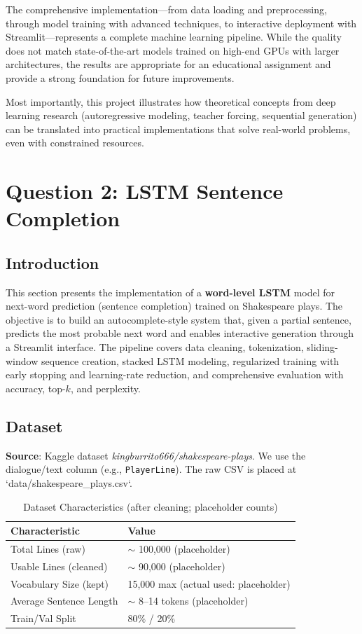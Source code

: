 \documentclass[12pt,a4paper]{article}
\begin{document}
The comprehensive implementation—from data loading and preprocessing, through model training with advanced techniques, to interactive deployment with Streamlit—represents a complete machine learning pipeline. While the quality does not match state-of-the-art models trained on high-end GPUs with larger architectures, the results are appropriate for an educational assignment and provide a strong foundation for future improvements.

Most importantly, this project illustrates how theoretical concepts from deep learning research (autoregressive modeling, teacher forcing, sequential generation) can be translated into practical implementations that solve real-world problems, even with constrained resources.

\newpage
\section{Question 2: LSTM Sentence Completion}

\subsection{Introduction}

This section presents the implementation of a \textbf{word-level LSTM} model for next-word prediction (sentence completion) trained on Shakespeare plays. The objective is to build an autocomplete-style system that, given a partial sentence, predicts the most probable next word and enables interactive generation through a Streamlit interface. The pipeline covers data cleaning, tokenization, sliding-window sequence creation, stacked LSTM modeling, regularized training with early stopping and learning-rate reduction, and comprehensive evaluation with accuracy, top-$k$, and perplexity.

\subsection{Dataset}

\textbf{Source}: Kaggle dataset \textit{kingburrito666/shakespeare-plays}. We use the dialogue/text column (e.g., \texttt{PlayerLine}). The raw CSV is placed at `data/shakespeare_plays.csv`.

\begin{table}[H]
\centering
\caption{Dataset Characteristics (after cleaning; placeholder counts)}
\begin{tabular}{@{}ll@{}}
\toprule
\textbf{Characteristic} & \textbf{Value} \\ \midrule
Total Lines (raw) & $\sim$ 100{,}000 (placeholder) \\
Usable Lines (cleaned) & $\sim$ 90{,}000 (placeholder) \\
Vocabulary Size (kept) & 15{,}000 max (actual used: placeholder) \\
Average Sentence Length & $\sim$ 8--14 tokens (placeholder) \\
Train/Val Split & 80\% / 20\% \\ \bottomrule
\end{tabular}
\end{table}
\end{document}
